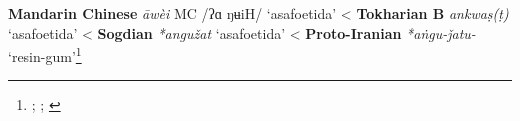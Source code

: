 \begin{etymology}\label{ety:awei}
\textbf{Mandarin Chinese}  \textit{āwèi} MC /ʔɑ ŋʉiH/ `asafoetida'
< \textbf{Tokharian B} \textit{ankwaṣ(ṭ)} `asafoetida'
< \textbf{Sogdian} \textit{*angužat} `asafoetida'
< \textbf{Proto-Iranian} \textit{*aṅgu-ǰatu-} `resin-gum'\footnote{\textcite{leung_itinerary_2019}; \textcite[353]{laufer_sino-iranica_1919}; \textcite[438]{tremblay_irano-tocharica_2005}}
\end{etymology}